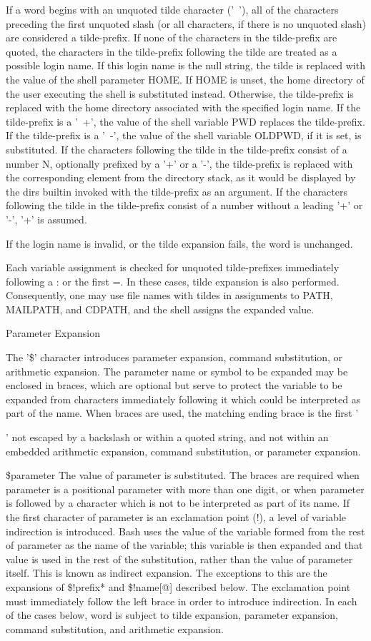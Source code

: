 {{If a word begins with an unquoted tilde character ('~'), all of the characters preceding the first unquoted slash (or all characters, if there is no unquoted slash) are considered a tilde-prefix. If none of the characters in the tilde-prefix are quoted, the characters in the tilde-prefix following the tilde are treated as a possible login name. If this login name is the null string, the tilde is replaced with the value of the shell parameter HOME. If HOME is unset, the home directory of the user executing the shell is substituted instead. Otherwise, the tilde-prefix is replaced with the home directory associated with the specified login name.
If the tilde-prefix is a '~+', the value of the shell variable PWD replaces the tilde-prefix. If the tilde-prefix is a '~-', the value of the shell variable OLDPWD, if it is set, is substituted. If the characters following the tilde in the tilde-prefix consist of a number N, optionally prefixed by a '+' or a '-', the tilde-prefix is replaced with the corresponding element from the directory stack, as it would be displayed by the dirs builtin invoked with the tilde-prefix as an argument. If the characters following the tilde in the tilde-prefix consist of a number without a leading '+' or '-', '+' is assumed.

If the login name is invalid, or the tilde expansion fails, the word is unchanged.

Each variable assignment is checked for unquoted tilde-prefixes immediately following a : or the first =. In these cases, tilde expansion is also performed. Consequently, one may use file names with tildes in assignments to PATH, MAILPATH, and CDPATH, and the shell assigns the expanded value.

Parameter Expansion

The '\$' character introduces parameter expansion, command substitution, or arithmetic expansion. The parameter name or symbol to be expanded may be enclosed in braces, which are optional but serve to protect the variable to be expanded from characters immediately following it which could be interpreted as part of the name.
When braces are used, the matching ending brace is the first '}' not escaped by a backslash or within a quoted string, and not within an embedded arithmetic expansion, command substitution, or parameter expansion.

\${parameter}
The value of parameter is substituted. The braces are required when parameter is a positional parameter with more than one digit, or when parameter is followed by a character which is not to be interpreted as part of its name.
If the first character of parameter is an exclamation point (!), a level of variable indirection is introduced. Bash uses the value of the variable formed from the rest of parameter as the name of the variable; this variable is then expanded and that value is used in the rest of the substitution, rather than the value of parameter itself. This is known as indirect expansion. The exceptions to this are the expansions of \${!prefix*} and \${!name[@]} described below. The exclamation point must immediately follow the left brace in order to introduce indirection.
In each of the cases below, word is subject to tilde expansion, parameter expansion, command substitution, and arithmetic expansion.

}
